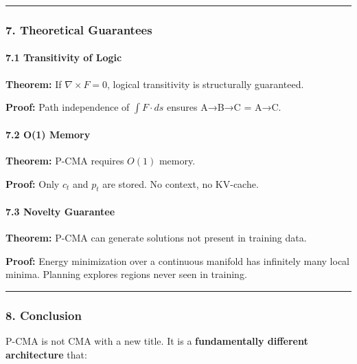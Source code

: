 \documentclass[
  11pt,
  a4paper,
]{article}
\begin{document}
\begin{center}\rule{0.5\linewidth}{0.5pt}\end{center}

\subsubsection{7. Theoretical Guarantees}\label{theoretical-guarantees}

\paragraph{7.1 Transitivity of Logic}\label{transitivity-of-logic}

\textbf{Theorem:} If \(\nabla \times F = 0\), logical transitivity is
structurally guaranteed.

\textbf{Proof:} Path independence of \(\int F \cdot ds\) ensures A→B→C =
A→C.

\paragraph{7.2 O(1) Memory}\label{o1-memory}

\textbf{Theorem:} P-CMA requires \(O(1)\) memory.

\textbf{Proof:} Only \(c_t\) and \(p_t\) are stored. No context, no
KV-cache.

\paragraph{7.3 Novelty Guarantee}\label{novelty-guarantee}

\textbf{Theorem:} P-CMA can generate solutions not present in training
data.

\textbf{Proof:} Energy minimization over a continuous manifold has
infinitely many local minima. Planning explores regions never seen in
training.

\begin{center}\rule{0.5\linewidth}{0.5pt}\end{center}

\subsubsection{8. Conclusion}\label{conclusion-1}

P-CMA is not CMA with a new title. It is a \textbf{fundamentally
different architecture} that:
\end{document}
